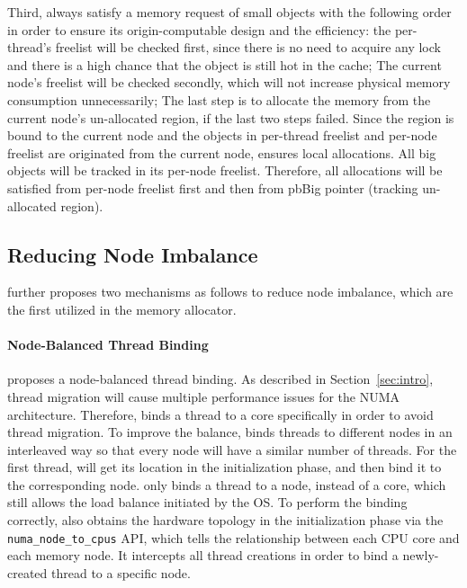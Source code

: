 Third, \NM{} always satisfy a memory request of small objects with the following order in order to ensure its origin-computable design and the efficiency: the per-thread's freelist will be checked first, since there is no need to acquire any lock and there is a high chance that the object is still hot in the cache; The current node's freelist will be checked secondly, which will not increase physical memory consumption unnecessarily; The last step is to allocate the memory from the current node's un-allocated region, if the last two steps failed. Since the region is bound to the current node and the objects in per-thread freelist and per-node freelist are originated from the current node, \NM{} ensures local allocations. All big objects will be tracked in its per-node freelist. Therefore, all allocations will be satisfied from per-node freelist first and then from pbBig pointer (tracking un-allocated region). 



\subsection{Reducing Node Imbalance}
\label{sec:balance}

\NM{} further proposes two mechanisms as follows to reduce node imbalance, which are the first utilized in the memory allocator. 

\paragraph{Node-Balanced Thread Binding} \NM{} proposes a node-balanced thread binding. As described in Section~\ref{sec:intro}, thread migration will cause multiple performance issues for the NUMA architecture. Therefore, \NM{} binds a thread to a core specifically in order to avoid thread migration. To improve the balance, \NM{} binds threads to different nodes in an interleaved way so that every node will have a similar number of threads. For the first thread, \NM{} will get its location in the initialization phase, and then bind it to the corresponding node. \NM{} only binds a thread to a node, instead of a core, which still allows the load balance initiated by the OS. To perform the binding correctly, \NM{} also obtains the hardware topology in the initialization phase via the \texttt{numa\_node\_to\_cpus} API, which tells the relationship between each CPU core and each memory node. It intercepts all thread creations in order to bind a newly-created thread to a specific node. %

